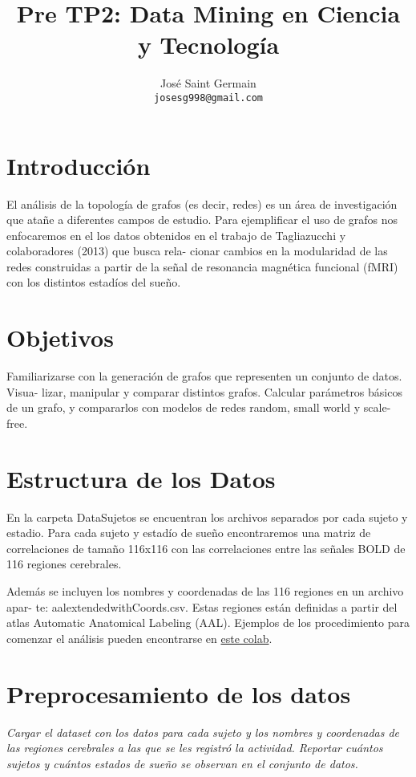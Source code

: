 \documentclass{article}
\title{Pre TP2: Data Mining en Ciencia y Tecnología}
\author{%
  José Saint Germain\\
  \texttt{josesg998@gmail.com} \\
}
\begin{document}
\maketitle

\section{Introducción}

El análisis de la topología de grafos (es decir, redes) es un área de investigación que
atañe a diferentes campos de estudio. Para ejempliﬁcar el uso de grafos nos enfocaremos en
el los datos obtenidos en el trabajo de Tagliazucchi y colaboradores (2013) que busca rela-
cionar cambios en la modularidad de las redes construidas a partir de la señal de resonancia
magnética funcional (fMRI) con los distintos estadíos del sueño.
\section{Objetivos}
Familiarizarse con la generación de grafos que representen un conjunto de datos. Visua-
lizar, manipular y comparar distintos grafos. Calcular parámetros básicos de un grafo, y
compararlos con modelos de redes random, small world y scale-free.

\section{Estructura de los Datos}
En la carpeta DataSujetos se encuentran los archivos separados por cada sujeto y estadio. Para cada sujeto y estadío de sueño encontraremos una matriz de correlaciones de tamaño
116x116 con las correlaciones entre las señales BOLD de 116 regiones cerebrales.

Además se incluyen los nombres y coordenadas de las 116 regiones en un archivo apar-
te: aalextendedwithCoords.csv. Estas regiones están deﬁnidas a partir del atlas Automatic
Anatomical Labeling (AAL). Ejemplos de los procedimiento para comenzar el análisis pueden encontrarse en \href{https://colab.research.google.com/drive/1xU8p_YSeSxPAODgiyJwJAVuuDC-jrTwP#scrollTo=VG4joS9_OZCA#offline=true&sandboxMode=true}{este colab}.

\section{Preprocesamiento de los datos}

\textit{Cargar el dataset con los datos para cada sujeto y los nombres y coordenadas 
de las regiones cerebrales a las que se les registró la actividad. Reportar cuántos sujetos y cuántos estados de sueño se observan en el conjunto de
datos.}
\end{document}

